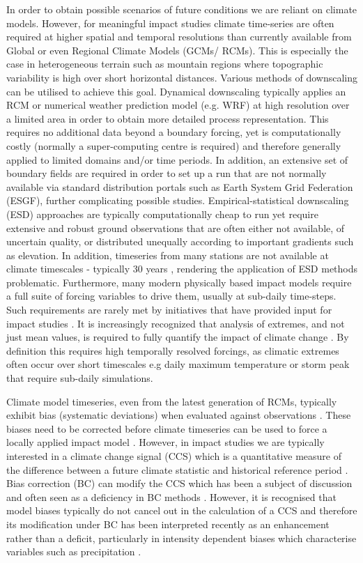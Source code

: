\documentclass[hess, manuscript]{copernicus}
\begin{document}
In order to obtain possible scenarios of future conditions we are reliant on climate models. However, for meaningful impact studies climate time-series are often required at higher spatial and temporal resolutions than currently available from Global or even Regional Climate Models (GCMs/ RCMs). This is especially the case in heterogeneous terrain such as mountain regions where topographic variability is high over short horizontal distances. Various methods of downscaling can be utilised to achieve this goal. Dynamical downscaling typically applies an RCM or numerical weather prediction model (e.g. WRF) at high resolution over a limited area in order to obtain more detailed process representation. This requires no additional data beyond a boundary forcing, yet is computationally costly (normally a super-computing centre is required) and therefore generally applied to limited domains and/or time periods. In addition, an extensive set of boundary fields are required in order to set up a run that are not normally available via standard distribution portals such as Earth System Grid Federation (ESGF), further complicating possible studies. Empirical-statistical downscaling (ESD) approaches are typically computationally cheap to run yet require extensive and robust ground observations that are often either not available, of uncertain quality, or distributed unequally according to important gradients such as elevation. In addition, timeseries from many stations are not available at climate timescales - typically 30 years \citep{Arguez2011-qv}, rendering the application of ESD methods problematic. Furthermore, many modern physically based impact models require a full suite of forcing variables to drive them, usually at sub-daily time-steps. Such requirements are rarely met by initiatives that have provided input for impact studies \citep{Michel2021-mb}. It is increasingly recognized that analysis of extremes, and not just mean values, is required to fully quantify the impact of climate change \citep{Katz1992-xb}. By definition this requires high temporally resolved forcings, as climatic extremes often occur over short timescales e.g daily maximum temperature or storm peak that require sub-daily simulations.

Climate model timeseries, even from the latest generation of RCMs, typically exhibit bias (systematic deviations) when evaluated against observations \citep{Ivanov2018-vz, Kotlarski2014-rf}. These biases need to be corrected before climate timeseries can be used to force a locally applied impact model \citep{Wood2004-vu}. However, in impact studies we are typically interested in a climate change signal (CCS) which is a quantitative measure of the difference between a future climate statistic and historical reference period \citep{Themesl2012-um}. Bias correction (BC) can modify the CCS \citep{Ivanov2018-vz, Themesl2012-um}  which has been a subject of discussion and often seen as a deficiency in BC methods \citep{Hempel2013-sj}. However, it is recognised that model biases typically do not cancel out in the calculation of a CCS and therefore its modification under BC has been interpreted recently as an enhancement rather than a deficit, particularly in intensity dependent biases which characterise variables such as precipitation \citep{Gobiet2015-yw}.
\end{document}
